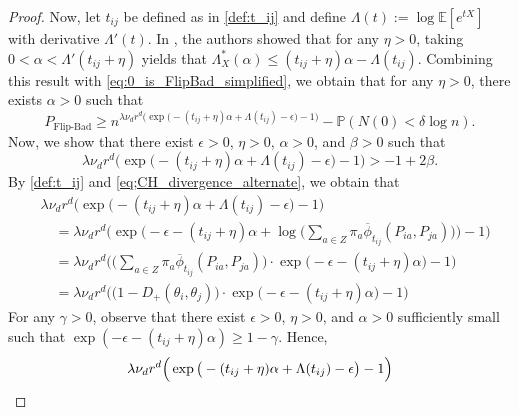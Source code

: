 \documentclass{article}
\renewcommand{\P}{\mathbb{P}}
\newcommand{\E}{\mathbb{E}}
\newcommand{\1}{\mathbbm{1}}
\theoremstyle{definition}
\theoremstyle{plain}
\begin{document}
\begin{proof}
    Now, let $t_{ij}$ be defined as in \eqref{def:t_ij} and define $\Lambda(t) := \log \E[e^{tX}]$ with derivative $\Lambda'(t)$. In \cite[Lemma B.4]{Gaudio+2025}, the authors showed that for any $\eta > 0$, taking $0 < \alpha < \Lambda'(t_{ij} + \eta)$ yields that $\Lambda^*_X(\alpha) \leq (t_{ij} + \eta)\alpha - \Lambda(t_{ij})$. Combining this result with \eqref{eq:0_is_FlipBad_simplified}, we obtain that for any $\eta > 0$, there exists $\alpha > 0$ such that
    \begin{equation}
    \label{eq:0_is_FlipBad_with_eta}
        P_\text{Flip-Bad} \geq n^{\lambda \nu_d r^d \big(\exp\big(-(t_{ij} + \eta)\alpha + \Lambda(t_{ij}) - \epsilon\big) - 1\big)} - \P(N(0) < \delta \log n).
    \end{equation}
    Now, we show that there exist $\epsilon > 0$, $\eta > 0$, $\alpha > 0$, and $\beta > 0$ such that 
    \begin{equation}
    \label{eq:FlipBad_exponent}
        \lambda \nu_d r^d  \Big(\exp\big(-(t_{ij} + \eta)\alpha + \Lambda(t_{ij}) - \epsilon\big) - 1\Big) > -1 + 2\beta.
    \end{equation}
    By \eqref{def:t_ij} and \eqref{eq;CH_divergence_alternate}, we obtain that
    \begin{equation*}
    \begin{aligned}
        &\lambda \nu_d r^d  \Big(\exp\big(-(t_{ij} + \eta)\alpha + \Lambda(t_{ij}) - \epsilon\big) - 1\Big) \\
        &\quad= \lambda \nu_d r^d  \bigg(\exp\bigg(-\epsilon -(t_{ij} + \eta)\alpha + \log\Big(\sum_{a \in Z} \pi_a \overline{\phi}_{t_{ij}}(P_{ia}, P_{ja}) \Big) \bigg) - 1\bigg) \\
        &\quad= \lambda \nu_d r^d \bigg(\Big(\sum_{a \in Z} \pi_a \overline{\phi}_{t_{ij}}(P_{ia}, P_{ja}) \Big) \cdot \exp\big(-\epsilon - (t_{ij} + \eta) \alpha \big) - 1 \bigg) \\
        &\quad= \lambda \nu_d r^d \bigg( \big(1 - D_+(\theta_i, \theta_j)\big) \cdot \exp\big(-\epsilon - (t_{ij} + \eta) \alpha \big) - 1 \bigg)
    \end{aligned}
    \end{equation*}
    For any $\gamma > 0$, observe that there exist $\epsilon > 0$, $\eta > 0$, and $\alpha > 0$ sufficiently small such that $\exp(-\epsilon - (t_{ij}+\eta)\alpha) \geq 1 - \gamma$. Hence, 
    \begin{align}
    \label{eq:FlipBad_exponent_simplified}
        &\lambda \nu_d r^d  \Big(\exp\big(-(t_{ij} + \eta)\alpha + \Lambda(t_{ij}) - \epsilon\big) - 1\Big) \notag \\

\end{align}
\end{proof}
\end{document}
